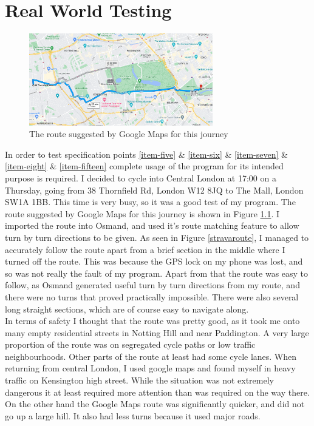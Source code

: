 \documentclass[11pt,twoside,a4paper]{report}
\begin{document}
\chapter{Real World Testing}
\label{Real World Testing}
\begin{figure}[h]
\begin{center}
    \includegraphics[width=8cm]{googlemapsroute.png}
\end{center}
\caption{The route suggested by Google Maps for this journey}
\label{googlemapsmall}
\end{figure}
In order to test specification points \ref{item-five} \& \ref{item-six} \& \ref{item-seven} \& \ref{item-eight} \& \ref{item-fifteen} complete usage of the program for its intended purpose is required.
I decided to cycle into Central London at 17:00 on a Thursday, going from 38 Thornfield Rd, London W12 8JQ to The Mall, London SW1A 1BB. This time is very busy, so it was a good test of my program.  The route suggested by Google Maps for this journey is shown in Figure \ref{googlemapsmall}.
I imported the route into Osmand, and used it's route matching feature to allow turn by turn directions to be given. As seen in Figure \ref{stravaroute}, I managed to accurately follow the route apart from a brief section in the middle where I turned off the route.
This was because the GPS lock on my phone was lost, and so was not really the fault of my program. Apart from that the route was easy to follow, as Osmand generated useful turn by turn directions from my route, and there were no turns that proved practically impossible.
There were also several long straight sections, which are of course easy to navigate along. \\
In terms of safety I thought that the route was pretty good, as it took me onto many empty residential streets in Notting Hill and near Paddington. A very large proportion of the route was on segregated cycle paths or low traffic neighbourhoods. Other parts of the route at least had some cycle lanes. 
When returning from central London, I used google maps and found myself in heavy traffic on Kensington high street. While the situation was not extremely dangerous it at least required more attention than was required on the way there. On the other hand the Google Maps route was significantly quicker, and did not go up a large hill. It also had less turns because it used major roads.   
\end{document}
